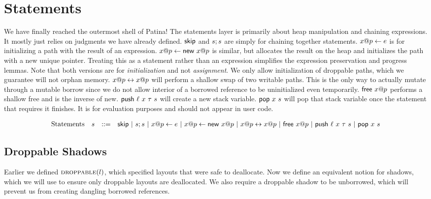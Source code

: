 \section*{Statements}
We have finally reached the outermost shell of Patina!
The statements layer is primarily about heap manipulation and chaining expressions.
It mostly just relies on judgments we have already defined.
$\mathsf{skip}$ and ${s};{s}$ are simply for chaining together statements.
${{x}@{p}} \leftarrow {e}$ is for initializing a path with the result of an expression.
${{x}@{p}} \leftarrow \textsf{new}\ {{x}@{p}}$ is similar, but allocates the result on the heap 
and initializes the path with a new unique pointer. 
Treating this as a statement rather than an expression
simplifies the expression preservation and progress lemmas.
Note that both versions are for \emph{initialization} and not \emph{assignment}.
We only allow initialization of droppable paths, which we guarantee will not orphan memory.
${{x}@{p}} \leftrightarrow {{x}@{p}}$ will perform a shallow swap of two writable paths.
This is the only way to actually mutate through a mutable borrow since we do not allow
interior of a borrowed reference to be uninitialized even temporarily.
$\textsf{free}\ {{x}@{p}}$ performs a shallow free and is the inverse of \textsf{new}.
$\textsf{push}\ {\ell}\ {x}\ {\tau}\ {s}$ will create a new stack variable.
$\textsf{pop}\ {x}\ {s}$ will pop that stack variable once the statement that requires it finishes.
It is for evaluation purposes and should not appear in user code.

\[
\begin{array}{lccl}
\textrm{Statements} & s & ::= & \mathsf{skip} ~|~ {s};{s} ~|~ {{x}@{p}} \leftarrow {e}
			  ~|~ {{x}@{p}} \leftarrow \textsf{new}\ {{x}@{p}} ~|~ {{x}@{p}} \leftrightarrow {{x}@{p}}
			  ~|~ \textsf{free}\ {{x}@{p}} ~|~ \textsf{push}\ {\ell}\ {x}\ {\tau}\ {s}
			  ~|~ \textsf{pop}\ {x}\ {s}
\end{array}
\]

\subsection*{Droppable Shadows}
Earlier we defined $\textsc{droppable}(l)$, which specified layouts that were safe to deallocate.
Now we define an equivalent notion for shadows, which we will use to ensure only droppable
layouts are deallocated. We also require a droppable shadow to be unborrowed, which will
prevent us from creating dangling borrowed references.
\newline


